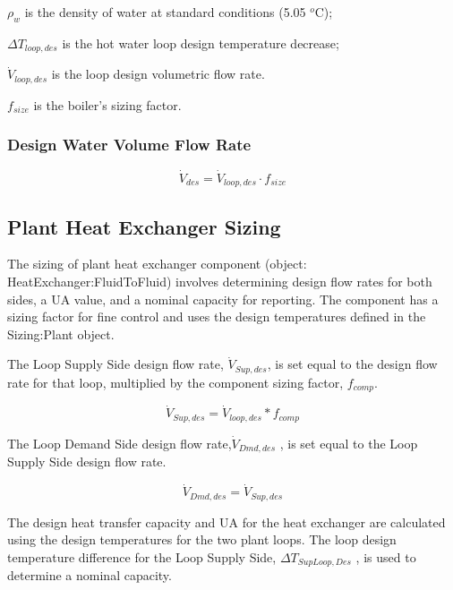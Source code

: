 \( \rho_w \) is the density of water at standard conditions (5.05 \(^{o}\)C);

\( \Delta T_{loop,des} \) is the hot water loop design temperature decrease;

\( \dot V_{loop,des} \) is the loop design volumetric flow rate.

\( f_{size} \) is the boiler's sizing factor.

\subsubsection{Design Water Volume Flow Rate}\label{design-boiler-water-flow-rate-1}

\begin{equation}
\dot V_{des} = \dot V_{loop,des} \cdot f_{size}
\end{equation}

\subsection{Plant Heat Exchanger Sizing}\label{plant-heat-exchanger-sizing}

The sizing of plant heat exchanger component (object: HeatExchanger:FluidToFluid) involves determining design flow rates for both sides, a UA value, and a nominal capacity for reporting. The component has a sizing factor for fine control and uses the design temperatures defined in the Sizing:Plant object.

The Loop Supply Side design flow rate, \({\dot V_{Sup,des}}\), is set equal to the design flow rate for that loop, multiplied by the component sizing factor, \({f_{comp}}\).

\begin{equation}
{\dot V_{Sup,des}} = {\dot V_{loop,des}}*{f_{comp}}
\end{equation}

The Loop Demand Side design flow rate,\({\dot V_{Dmd,des}}\) , is set equal to the Loop Supply Side design flow rate.

\begin{equation}
{\dot V_{Dmd,des}} = {\dot V_{Sup,des}}
\end{equation}

The design heat transfer capacity and UA for the heat exchanger are calculated using the design temperatures for the two plant loops. The loop design temperature difference for the Loop Supply Side, \(\Delta {T_{SupLoop,Des}}\) , is used to determine a nominal capacity.

